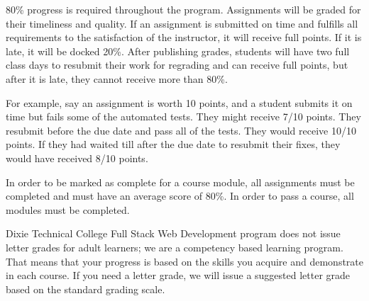 80\% progress is required throughout the program. Assignments will be graded for their timeliness
and quality. If an assignment is submitted on time and fulfills all requirements to the satisfaction
of the instructor, it will receive full points. If it is late, it will be docked 20\%. After publishing
grades, students will have two full class days to resubmit their work for regrading and
can receive full points, but after it is late, they cannot receive more than 80\%.
\par
\bigskip
For example, say an assignment is worth 10 points, and a student submits it on time but fails some of the
automated tests. They might receive 7/10 points. They resubmit before the due date and pass all of the tests. They would receive
10/10 points. If they had waited till after the due date to resubmit their fixes, they would have received 8/10 points.
\par
\bigskip
In order to be marked as complete for a course module, all assignments must be completed and must have an
average score of 80\%. In order to pass a course, all modules must be completed.
\par
\bigskip
Dixie Technical College Full Stack Web Development program does not issue letter grades for adult learners; we are
a competency based learning program. That means that your progress is based on the skills you acquire
and demonstrate in each course. If you need a letter grade, we will issue a suggested letter grade based
on the standard grading scale.
